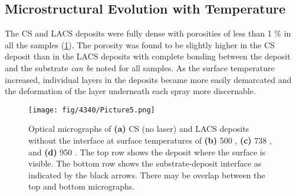 \subsection*{Microstructural Evolution with Temperature}


The CS and LACS deposits were fully dense with porosities of less than 1 $\%$  in all the samples (\ref{fig:43405}). The porosity was found to be slightly higher in the CS deposit than in the LACS deposits with complete bonding between the deposit and the substrate \textit{can be} noted for all samples. As the surface temperature increased, individual layers in the deposits became more easily demarcated and the deformation of the layer underneath each spray more discernable. 


\begin{figure}
	\centering
	\texttt{[image: fig/4340/Picture5.png]}
	\caption[Optical micrographs of CS and LACS deposits of 4340 steel.]{Optical micrographs of \textbf{(a)} CS (no laser) and LACS deposits without the interface at surface temperatures of \textbf{(b)} 500 \celsius{}, \textbf{(c)} 738 \celsius{}, and \textbf{(d)} 950 \celsius{}. The top row shows the deposit where the surface is visible. The bottom row shows the substrate-deposit interface as indicated by the black arrows. There may be overlap between the top and bottom micrographs.}
	\label{fig:43405}
\end{figure}


